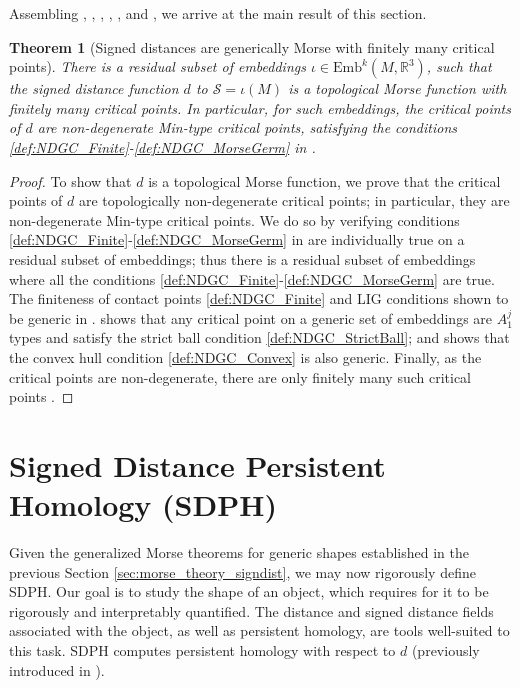 \documentclass[11pt]{article}
\newcommand{\R}{\mathbb{R}}
\newcommand{\io}{\iota}
\newcommand{\Emb}{\mathrm{Emb}^k(M,\R^3)}
\newcommand{\Surf}{\mathcal{S}}
\theoremstyle{plain}
\newtheorem{thm}{Theorem}
\theoremstyle{definition}
\theoremstyle{remark}
\begin{document}
Assembling , , , , , and , we arrive at the main result of this section. 

\begin{thm}[Signed distances are generically Morse with finitely many critical points]
	\label{thm:generic}
There is a residual subset of embeddings $\io \in \Emb$, such that the signed distance function $d$ to $\Surf = \io(M)$ is a topological Morse function with finitely many critical points. In particular, for such embeddings, the critical points of $d$ are non-degenerate Min-type critical points, satisfying the conditions \ref{def:NDGC_Finite}-\ref{def:NDGC_MorseGerm} in .
\end{thm}

\begin{proof}
    To show that $d$ is a topological Morse function, we prove that the critical points of $d$ are topologically non-degenerate critical points; in particular, they are non-degenerate Min-type critical points. We do so by verifying conditions \ref{def:NDGC_Finite}-\ref{def:NDGC_MorseGerm} in  are individually true on a residual subset of embeddings; thus there is a residual subset of embeddings where all the conditions \ref{def:NDGC_Finite}-\ref{def:NDGC_MorseGerm} are true. The finiteness of contact points \ref{def:NDGC_Finite} and LIG  conditions shown to be generic in .  shows that any critical point on a generic set of embeddings are $A_1^j$ types and satisfy the strict ball condition \ref{def:NDGC_StrictBall}; and  shows that the convex hull condition \ref{def:NDGC_Convex} is also generic. Finally, as the critical points are non-degenerate, there are only finitely many such critical points . 
\end{proof}

\section{Signed Distance Persistent Homology (SDPH)}
\label{sec:SDPH}

Given the generalized Morse theorems for generic shapes established in the previous Section \ref{sec:morse_theory_signdist}, we may now rigorously define SDPH. Our goal is to study the shape of an object, which requires for it to be rigorously and interpretably quantified. The distance and signed distance fields associated with the object, as well as persistent homology, are tools well-suited to this task. SDPH computes persistent homology with respect to $d$ (previously introduced in ).
\end{document}
